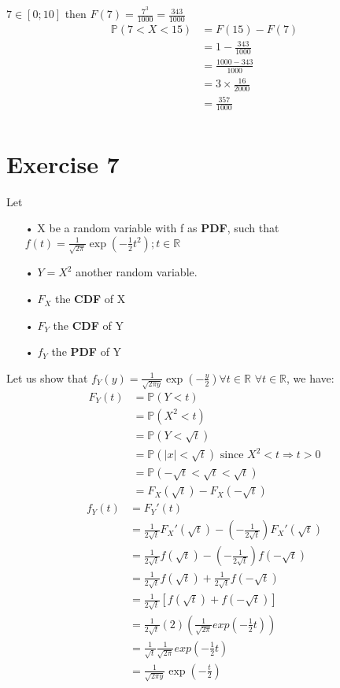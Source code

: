 \documentclass[11pt]{article}
\def\gt{>}
\def\lt{<}
\begin{document}
$7 \in \left[0 ; 10\right] $ then $F(7)=\frac{7^3}{1000}=\frac{343}{1000}$
\begin{align*}
\mathbb{P}(7 \lt X \lt 15) &= F(15)-F(7) \\
                 &=1-\frac{343}{1000}\\ 
 			 	  &=\frac{1000-343}{1000}\\
 			 	  &= 3\times \frac{16}{2000}\\
 			 	  &= \frac{357}{1000}\\  
\end{align*}  
    
\newpage 
    \section{Exercise 7}
    Let 
    \begin{itemize}
    \item[•] X be a random variable with f as \textbf{PDF}, such that
      $ f(t)=\frac{1}{\sqrt{2\pi}}\exp(-\frac{1}{2}t^2 ) ; t\in \mathbb{R}$
      \item[•] $Y=X^2$ another random variable.
      \item[•] $F_X$ the \textbf{CDF} of X
      \item[•] $F_Y$ the \textbf{CDF} of Y
      \item[•] $f_Y$ the \textbf{PDF} of Y
    \end{itemize}
    Let us show that $f_Y(y)=\frac{1}{\sqrt{2\pi y}}\exp(-\frac{y}{2}) \forall t\in \mathbb{R}$
   $\forall t\in \mathbb{R}$, we have:
   \begin{align*}
    F_Y(t) &= \mathbb{P}(Y < t) \\
           &= \mathbb{P}(X^2 < t) \\
           &= \mathbb{P}(Y < \sqrt{t})\\
           &= \mathbb{P}(\lvert x \rvert < \sqrt{t}) \text{ since } X^2 \lt t \Rightarrow t \gt 0\\           
           &= \mathbb{P}(-\sqrt{t} \lt  \sqrt{t} \lt \sqrt{t} ) \\ 
           &=  F_X(\sqrt{t})-F_X(-\sqrt{t})                    
\end{align*}
\begin{align*}
    f_Y(t) &= F_Y'(t) \\
           &= \frac{1}{2\sqrt{t}}F_X'(\sqrt{t})-(-\frac{1}{2\sqrt{t}})F_X'(\sqrt{t}) \\
          &= \frac{1}{2\sqrt{t}}f(\sqrt{t})-(-\frac{1}{2\sqrt{t}})f(-\sqrt{t}) \\                                          
          &= \frac{1}{2\sqrt{t}}f(\sqrt{t})+\frac{1}{2\sqrt{t}}f(-\sqrt{t}) \\                                          
          &= \frac{1}{2\sqrt{t}}[f(\sqrt{t})+f(-\sqrt{t})] \\
          &= \frac{1}{2\sqrt{t}}(2)(\frac{1}{\sqrt{2\pi}} exp(-\frac{1}{2}t )) \\          
           &= \frac{1}{\sqrt{t}}\frac{1}{\sqrt{2\pi}} exp(-\frac{1}{2}t ) \\ 
           &=\frac{1}{\sqrt{2\pi y}}\exp(-\frac{t}{2})         
\end{align*}
\end{document}
